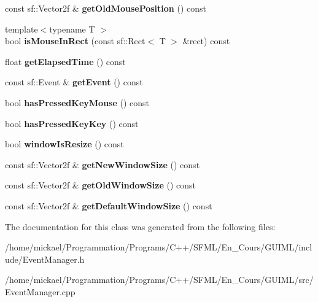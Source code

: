 \begin{DoxyCompactItemize}
\item 
const sf\-::\-Vector2f \& {\bfseries get\-Old\-Mouse\-Position} () const \label{class_event_manager_aa615d63fc8c85ef32d207969ba5f9da2}

\item 
{\footnotesize template$<$typename T $>$ }\\bool {\bfseries is\-Mouse\-In\-Rect} (const sf\-::\-Rect$<$ T $>$ \&rect) const \label{class_event_manager_accca3e09e0d84dfc950eb7374b62a914}

\item 
float {\bfseries get\-Elapsed\-Time} () const \label{class_event_manager_af8e4c128f65570c9817309cc892ae4d7}

\item 
const sf\-::\-Event \& {\bfseries get\-Event} () const \label{class_event_manager_af484597f0198eb71151a80e48859e8b4}

\item 
bool {\bfseries has\-Pressed\-Key\-Mouse} () const \label{class_event_manager_af6e53bbf7f93edc1a4896c016cdfdfea}

\item 
bool {\bfseries has\-Pressed\-Key\-Key} () const \label{class_event_manager_a3a4a0b2e8252d9e4b8ccb7a6566e83b5}

\item 
bool {\bfseries window\-Is\-Resize} () const \label{class_event_manager_a5c9d24eede4138597e50d3cffda4cae2}

\item 
const sf\-::\-Vector2f \& {\bfseries get\-New\-Window\-Size} () const \label{class_event_manager_ad0b72a0219b4851a024a7592b1495af4}

\item 
const sf\-::\-Vector2f \& {\bfseries get\-Old\-Window\-Size} () const \label{class_event_manager_a8248a4b963e594489e24ab53d607ffc1}

\item 
const sf\-::\-Vector2f \& {\bfseries get\-Default\-Window\-Size} () const \label{class_event_manager_a30c818268351239bb9b4f784e74bd949}

\end{DoxyCompactItemize}


The documentation for this class was generated from the following files\-:\begin{DoxyCompactItemize}
\item 
/home/mickael/\-Programmation/\-Programs/\-C++/\-S\-F\-M\-L/\-En\-\_\-\-Cours/\-G\-U\-I\-M\-L/include/Event\-Manager.\-h\item 
/home/mickael/\-Programmation/\-Programs/\-C++/\-S\-F\-M\-L/\-En\-\_\-\-Cours/\-G\-U\-I\-M\-L/src/Event\-Manager.\-cpp\end{DoxyCompactItemize}
